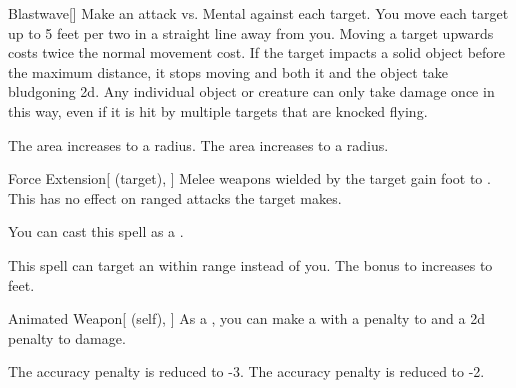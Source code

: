\lowercase{\hypertarget{spell:Blastwave}{}}\label{spell:Blastwave}
\begin{freeability}[Rank 3]{\hypertarget{spell:Blastwave}{Blastwave}}[]
Make an attack vs. Mental against each target.
\hit You move each target up to 5 feet per two  in a straight line away from you.
Moving a target upwards costs twice the normal movement cost.
If the target impacts a solid object before the maximum distance, it stops moving and both it and the object take bludgoning  \minus2d.
Any individual object or creature can only take damage once in this way, even if it is hit by multiple targets that are knocked flying.

\rankline
{} The area increases to a \arealarge radius.
 The area increases to a \areahuge radius.

\end{freeability}
\vspace{0.25em}



\lowercase{\hypertarget{spell:Force Extension}{}}\label{spell:Force Extension}
\begin{attuneability}[Rank 3]{\hypertarget{spell:Force Extension}{Force Extension}}[ (target), ]
Melee weapons wielded by the target gain  foot  to .
This has no effect on ranged attacks the target makes.

You can cast this spell as a .

\rankline
{} This spell can target an  within \rngmed range instead of you.
 The bonus to  increases to  feet.

\end{attuneability}
\vspace{0.25em}



\lowercase{\hypertarget{spell:Animated Weapon}{}}\label{spell:Animated Weapon}
\begin{attuneability}[Rank 4]{\hypertarget{spell:Animated Weapon}{Animated Weapon}}[ (self), ]
As a , you can make a  with a  penalty to  and a \minus2d penalty to damage.

\rankline
{} The accuracy penalty is reduced to -3.
 The accuracy penalty is reduced to -2.

\end{attuneability}
\vspace{0.25em}



